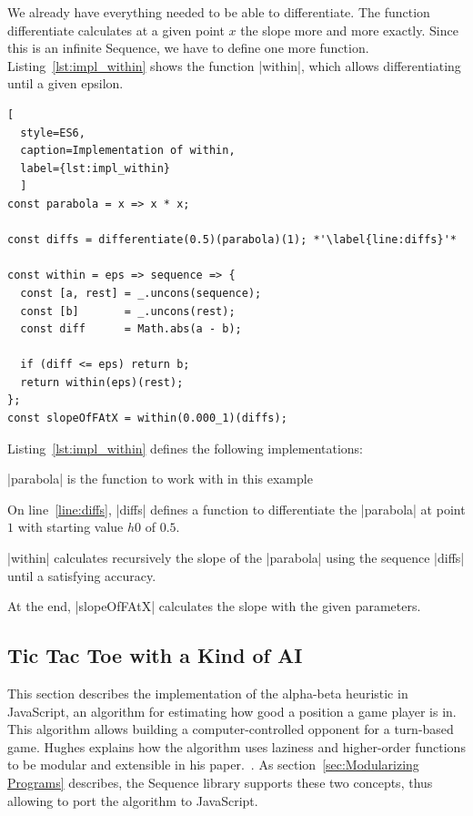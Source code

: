 We already have everything needed to be able to differentiate.  The function
differentiate calculates at a given point $x$ the slope more and more exactly.
Since this is an infinite Sequence, we have to define one more function.
Listing~\ref{lst:impl_within} shows the function |within|, which allows differentiating until a
given epsilon.

\begin{lstlisting}[
  style=ES6, 
  caption=Implementation of within,
  label={lst:impl_within}
  ]
const parabola = x => x * x;

const diffs = differentiate(0.5)(parabola)(1); *'\label{line:diffs}'*

const within = eps => sequence => {
  const [a, rest] = _.uncons(sequence);
  const [b]       = _.uncons(rest);
  const diff      = Math.abs(a - b);

  if (diff <= eps) return b;
  return within(eps)(rest);
};
const slopeOfFAtX = within(0.000_1)(diffs);
\end{lstlisting}

Listing~\ref{lst:impl_within} defines the following implementations:

\begin{itemize}
  \item{|parabola| is the function to work with in this example}
  \item{On line~\ref{line:diffs}, |diffs| defines a function to differentiate the |parabola| at point $1$ with
    starting value $h0$ of $0.5$.}
  \item{|within| calculates recursively the slope of the |parabola| using the
      sequence |diffs| until a satisfying accuracy. 
    \item{ At the end, |slopeOfFAtX| calculates the slope with the given parameters. }
    }
\end{itemize}


\subsection{Tic Tac Toe with a Kind of AI}
\label{sub:Alpha - Beta Algorithm}
This section describes the implementation of the alpha-beta heuristic in
JavaScript, an algorithm for estimating how good a position a game player is
in. \\ 
This algorithm allows building a computer-controlled opponent for a
turn-based game. Hughes explains how the algorithm uses laziness and
higher-order functions to be modular and extensible in his paper.~\cite[p.
16]{hughes_why_1989}. As section~\ref{sec:Modularizing Programs} describes, the
Sequence library supports these two concepts, thus allowing to port the
algorithm to JavaScript.


